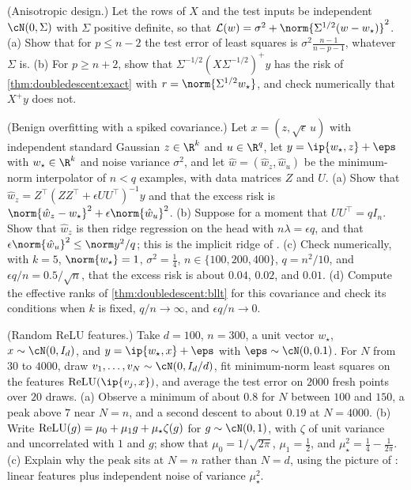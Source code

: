 \begin{refsection}
\begin{exercises}
\item \variation (Anisotropic design.) Let the rows of $X$ and the test inputs be independent $\cN(0,\Sigma)$ with $\Sigma$ positive definite, so that $\Loss(w)=\sigma^2+\norm{\Sigma^{1/2}(w-w_\star)}^2$. (a) Show that for $p\le n-2$ the test error of least squares is $\sigma^2\frac{n-1}{n-p-1}$, whatever $\Sigma$ is. (b) For $p\ge n+2$, show that $\Sigma^{-1/2}(X\Sigma^{-1/2})^+y$ has the risk of \cref{thm:doubledescent:exact} with $r=\norm{\Sigma^{1/2}w_\star}$, and check numerically that $X^+y$ does not.\label{ex:doubledescent:aniso}

\item \variation\hard (Benign overfitting with a spiked covariance.) Let $x=(z,\sqrt\epsilon\,u)$ with independent standard Gaussian $z\in\R^k$ and $u\in\R^q$, let $y=\ip{w_\star,z}+\eps$ with $w_\star\in\R^k$ and noise variance $\sigma^2$, and let $\hat w=(\hat w_z,\hat w_u)$ be the minimum-norm interpolator of $n<q$ examples, with data matrices $Z$ and $U$. (a) Show that $\hat w_z=Z^\top(ZZ^\top+\epsilon UU^\top)^{-1}y$ and that the excess risk is $\norm{\hat w_z-w_\star}^2+\epsilon\norm{\hat w_u}^2$. (b) Suppose for a moment that $UU^\top=qI_n$. Show that $\hat w_z$ is then ridge regression on the head with $n\lambda=\epsilon q$, and that $\epsilon\norm{\hat w_u}^2\le\norm y^2/q$; this is the implicit ridge of \textcite{KobakEtAl2020}. (c) Check numerically, with $k=5$, $\norm{w_\star}=1$, $\sigma^2=\frac14$, $n\in\{100,200,400\}$, $q=n^2/10$, and $\epsilon q/n=0.5/\sqrt n$, that the excess risk is about $0.04$, $0.02$, and $0.01$. (d) Compute the effective ranks of \cref{thm:doubledescent:bllt} for this covariance and check its conditions when $k$ is fixed, $q/n\to\infty$, and $\epsilon q/n\to0$. \label{ex:doubledescent:spiked}

\item \simulation (Random ReLU features.) Take $d=100$, $n=300$, a unit vector $w_\star$, $x\sim\cN(0,I_d)$, and $y=\ip{w_\star,x}+\eps$ with $\eps\sim\cN(0,0.1)$. For $N$ from $30$ to $4000$, draw $v_1,\dots,v_N\sim\cN(0,I_d/d)$, fit minimum-norm least squares on the features $\relu(\ip{v_j,x})$, and average the test error on $2000$ fresh points over $20$ draws. (a) Observe a minimum of about $0.8$ for $N$ between $100$ and $150$, a peak above $7$ near $N=n$, and a second descent to about $0.19$ at $N=4000$. (b) Write $\operatorname{ReLU}(g)=\mu_0+\mu_1g+\mu_\star\zeta(g)$ for $g\sim\cN(0,1)$, with $\zeta$ of unit variance and uncorrelated with $1$ and $g$; show that $\mu_0=1/\sqrt{2\pi}$, $\mu_1=\frac12$, and $\mu_\star^2=\frac14-\frac1{2\pi}$. (c) Explain why the peak sits at $N=n$ rather than $N=d$, using the picture of \textcite{MeiMontanari2022}: linear features plus independent noise of variance $\mu_\star^2$.\label{ex:doubledescent:relu}


\end{exercises}
\end{refsection}
